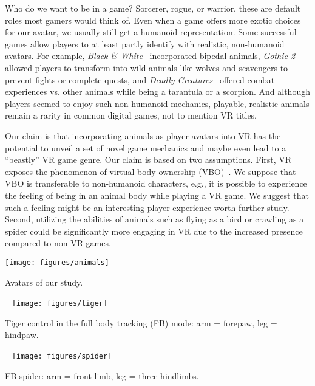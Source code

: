 \documentclass{sigchi-ext}
\begin{document}
Who do we want to be in a game? Sorcerer, rogue, or warrior, these are default roles most gamers would think of. Even when a game offers more exotic choices for our avatar, we usually still get a humanoid representation. Some successful games allow players to at least partly identify with realistic, non-humanoid avatars. For example, \textit{Black \& White}~\cite{BlackWhite} incorporated bipedal animals, \textit{Gothic 2}~\cite{Gothic} allowed players to transform into wild animals like wolves and scavengers to prevent fights or complete quests, and \textit{Deadly Creatures}~\cite{Deadly} offered combat experiences vs. other animals while being a tarantula or a scorpion. And although players seemed to enjoy such non-humanoid mechanics, playable, realistic animals remain a rarity in common digital games, not to mention VR titles. 


Our claim is that incorporating animals as player avatars into VR has the potential to unveil a set of novel game mechanics and maybe even lead to a ``beastly'' VR game genre. Our claim is based on two assumptions. First, VR exposes the phenomenon of virtual body ownership (VBO)~\cite{slater2010first}. We suppose that VBO is transferable to non-humanoid characters, e.g., it is possible to experience the feeling of being in an animal body while playing a VR game. We suggest that such a feeling might be an interesting player experience worth further study. Second, utilizing the abilities of animals such as flying as a bird or crawling as a spider could be significantly more engaging in VR due to the increased presence compared to non-VR games.

\begin{marginfigure}[-20pc]
  \begin{minipage}{\marginparwidth}
    \centering
    \texttt{[image: figures/animals]}
    \caption{Avatars of our study.}~\label{fig:animals}
    \vspace{2pc} 
        \centering
    \texttt{[image: figures/tiger]}
    \caption{Tiger control in the full body tracking (FB) mode: arm = forepaw, leg = hindpaw.}~\label{fig:tiger}
    \vspace{1pc} 
            \centering
    \texttt{[image: figures/spider]}
    \caption{FB spider: arm = front limb, leg = three hindlimbs.}~\label{fig:spider}
  \end{minipage}
\end{marginfigure}
\end{document}
